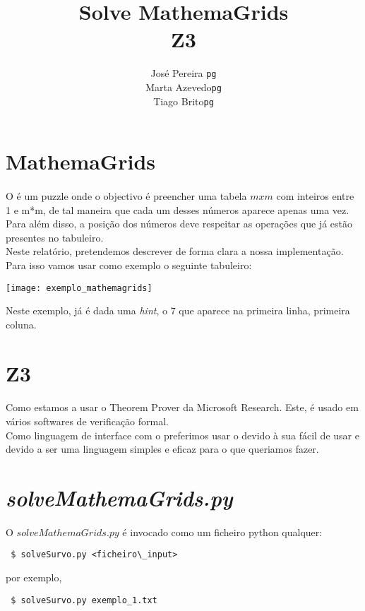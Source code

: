 \documentclass{article}
\title{Solve MathemaGrids\\ Z3}
\author{José Pereira \texttt{pg} 
		\\ Marta Azevedo\texttt{pg}
		              \\ Tiago Brito\texttt{pg}}
\begin{document}
\maketitle
\section{MathemaGrids}

\paragraph{} 
O {} é um puzzle onde o objectivo é preencher uma tabela $mxm$ com inteiros entre 1 e m*m, de tal maneira que cada um desses números aparece apenas uma vez. 
\\

Para além disso, a posição dos números deve respeitar as operações que já estão presentes no tabuleiro.
\\
Neste relatório, pretendemos descrever de forma clara a nossa implementação.
\\

Para isso vamos usar como exemplo o seguinte tabuleiro:
\begin{center}
\texttt{[image: exemplo\_mathemagrids]}
\end{center}

Neste exemplo, já é dada uma {\it{hint}}, o $7$ que aparece na primeira linha, primeira coluna.

\section{Z3}
\paragraph{} 
Como {} estamos a usar o {} Theorem Prover da Microsoft Research. Este, é usado em vários softwares de verificação formal. 
\\

Como linguagem de interface com o {} preferimos usar o {} {} devido à sua {} fácil de usar e devido a ser uma linguagem simples e eficaz para o que queriamos fazer.

\section{{\it{solveMathemaGrids.py}}}

\paragraph{} 
O $solveMathemaGrids.py$ é invocado como um ficheiro python qualquer:
\begin{verbatim}
 $ solveSurvo.py <ficheiro\_input>
\end{verbatim}
por exemplo,
\begin{verbatim}
 $ solveSurvo.py exemplo_1.txt
\end{verbatim}
\end{document}
